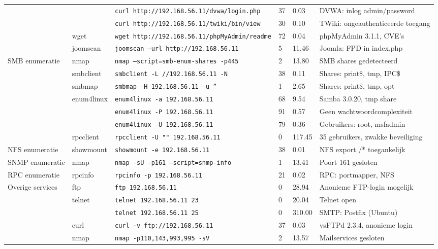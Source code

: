 {\begin{landscape}
\begin{longtable}{lllp{2cm}p{1.2cm}p{4cm}}
 & & \texttt{curl http://192.168.56.11/dvwa/login.php} & 37 & 0.03 & DVWA: inlog admin/password \\
 & & \texttt{curl http://192.168.56.11/twiki/bin/view} & 30 & 0.10 & TWiki: ongeauthenticeerde toegang \\
 & wget & \texttt{wget http://192.168.56.11/phpMyAdmin/readme} & 72 & 0.04 & phpMyAdmin 3.1.1, CVE's \\
 & joomscan & \texttt{joomscan --url http://192.168.56.11} & 5 & 11.46 & Joomla: FPD in index.php \\
\multirow{7}{*}{SMB enumeratie} & nmap & \texttt{nmap --script=smb-enum-shares -p445} & 2 & 13.80 & SMB shares gedetecteerd \\
 & smbclient & \texttt{smbclient -L //192.168.56.11 -N} & 38 & 0.11 & Shares: print\$, tmp, IPC\$ \\
 & smbmap & \texttt{smbmap -H 192.168.56.11 -u ''} & 1 & 2.65 & Shares: print\$, tmp, opt \\
 & \multirow{3}{*}{enum4linux} & \texttt{enum4linux -a 192.168.56.11} & 68 & 9.54 & Samba 3.0.20, tmp share \\
 & & \texttt{enum4linux -P 192.168.56.11} & 91 & 0.57 & Geen wachtwoordcomplexiteit \\
 & & \texttt{enum4linux -U 192.168.56.11} & 79 & 0.36 & Gebruikers: root, msfadmin \\
 & rpcclient & \texttt{rpcclient -U "" 192.168.56.11} & 0 & 117.45 & 35 gebruikers, zwakke beveiliging \\
NFS enumeratie & showmount & \texttt{showmount -e 192.168.56.11} & 38 & 0.01 & NFS export /* toegankelijk \\
SNMP enumeratie & nmap & \texttt{nmap -sU -p161 --script=snmp-info} & 1 & 13.41 & Poort 161 gesloten \\
RPC enumeratie & rpcinfo & \texttt{rpcinfo -p 192.168.56.11} & 21 & 0.02 & RPC: portmapper, NFS \\
\multirow{5}{*}{Overige services} & ftp & \texttt{ftp 192.168.56.11} & 0 & 28.94 & Anonieme FTP-login mogelijk \\
 & \multirow{2}{*}{telnet} & \texttt{telnet 192.168.56.11 23} & 0 & 20.04 & Telnet open \\
 & & \texttt{telnet 192.168.56.11 25} & 0 & 310.00 & SMTP: Postfix (Ubuntu) \\
 & curl & \texttt{curl -v ftp://192.168.56.11} & 37 & 0.03 & vsFTPd 2.3.4, anonieme login \\
 & nmap & \texttt{nmap -p110,143,993,995 -sV} & 2 & 13.57 & Mailservices gesloten \\

\end{longtable}
\end{landscape}}
